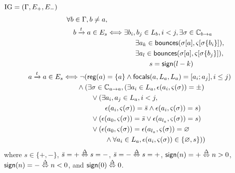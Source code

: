 \begin{definition}\label{def:inference-IG}
$\mathrm{IG} = (\Gamma,E_+,E_-)$
\begin{align}
\begin{split}
\forall b\in\Gamma, b\neq a, \\
b\xrightarrow t a \in E_s & \Longleftrightarrow
	\exists b_i,b_j\in L_b, i < j, \exists \sigma\in\mathbb C_{b\rightarrow a} \\
& \qquad\qquad
	\exists a_{k}\in\mathsf{bounces}(\sigma[a],\varsigma[\sigma\{b_i\}]), \\
& \qquad\qquad
	\exists a_{l}\in\mathsf{bounces}(\sigma[a],\varsigma[\sigma\{b_j\}]), \\
& \qquad\qquad\qquad
			s = \mathsf{sign}(l - k)
\end{split}
\label{eq:IG-inference-b}
\\
\begin{split}
a \xrightarrow t a \in E_s & \Longleftrightarrow
\neg(\mathsf{reg}({a}) = \{a\} \wedge \mathsf{focals}(a, L_a, L_a) = [a_i;a_j], i\leq j) \\
& \qquad \wedge (\exists\sigma\in\mathbb C_{a\rightarrow a}, 
		(\exists a_i\in L_a, \epsilon(a_i,\varsigma(\sigma)) = \pm)\\
& \qquad\qquad \vee
	(\exists a_i,a_j\in L_a, i < j, \\
& \qquad\qquad\qquad
		\epsilon(a_i,\varsigma(\sigma)) = \bar s \wedge \epsilon(a_i,\varsigma(\sigma)) = s) \\
& \qquad\qquad \vee
	(\epsilon(a_0, \varsigma(\sigma)) = \bar s \vee \epsilon(a_{l_a}, \varsigma(\sigma)) = s) \\
& \qquad\qquad \vee
	(\epsilon(a_0, \varsigma(\sigma)) = \epsilon(a_{l_a}, \varsigma(\sigma)) = \varnothing \\
& \qquad\qquad\qquad
			\wedge \forall a_i\in L_a, \epsilon(a_i, \varsigma(\sigma))\in \{\varnothing, s\})
		)
\end{split}
\end{align}
where $s \in \{ +, - \}$, $\bar s = + \stackrel{\Delta}\Leftrightarrow s = -$, $\bar s = - \stackrel{\Delta}\Leftrightarrow s = +$,
$\mathsf{sign}(n) = + \stackrel{\Delta}\Leftrightarrow n > 0$,
$\mathsf{sign}(n) = - \stackrel{\Delta}\Leftrightarrow n < 0$,
and $\mathsf{sign}(0) \stackrel{\Delta}\Leftrightarrow 0$.
\end{definition}






